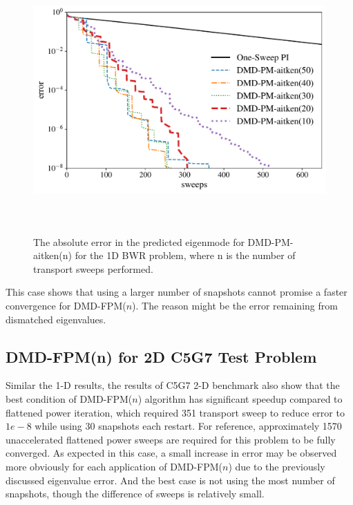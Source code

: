 \begin{figure}[htb]%
    \centering
    \includegraphics[height=4.0in]{tex/figures/dmd_ospi_semilog_1d.pdf}
    \caption{The absolute error in the predicted eigenmode for DMD-PM-aitken(n) for the 1D BWR problem, where n is the number of transport sweeps performed.}
    \label{fig:DMD-FPM_1d}
\end{figure}

This case shows that using a larger number of snapshots cannot promise a faster convergence for DMD-FPM($n$).
The reason might be the error remaining from dismatched eigenvalues.

\subsection{DMD-FPM(n) for 2D C5G7 Test Problem}

Similar the 1-D results, the results of C5G7 2-D benchmark also show that the best condition of DMD-FPM($n$) algorithm has significant speedup compared to flattened power iteration, which required 351 transport sweep to reduce error to $1e-8$ while using 30 snapshots each restart.
For reference, approximately 1570 unaccelerated flattened power sweeps are required for this problem to be fully converged.
As expected in this case, a small increase in error may be observed more obviously for each application of DMD-FPM($n$) due to the previously discussed eigenvalue error.
And the best case is not using the most number of snapshots, though the difference of sweeps is relatively small.

